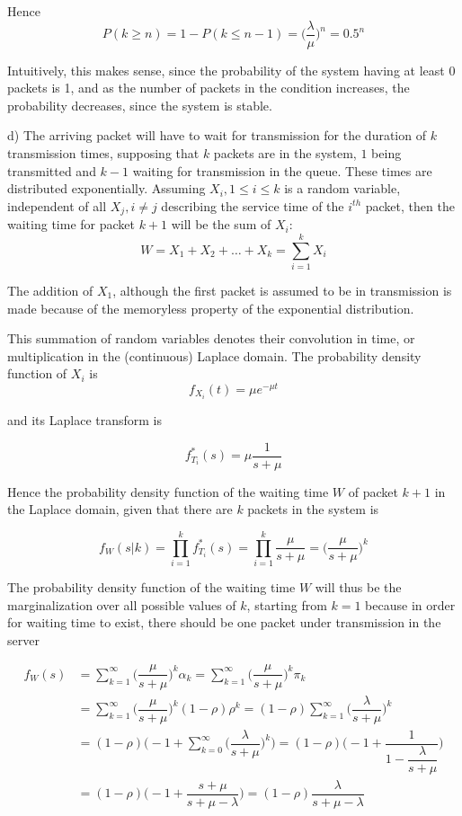 Hence
$$P(k \geq n) = 1 - P(k \leq n-1) = \Big(\dfrac{\lambda}{\mu}\Big)^n = 0.5^n$$

Intuitively, this makes sense, since the probability of the system having at
least 0 packets is 1, and as the number of packets in the condition increases,
the probability decreases, since the system is stable.

d)
The arriving packet will have to wait for transmission for the duration of $k$
transmission times, supposing that $k$ packets are in the system, $1$ being
transmitted and $k-1$ waiting for transmission in the queue. These times are
distributed exponentially. Assuming $X_i, 1 \leq i \leq k$ is a random variable,
independent of all $X_j, i \neq j$ describing the service time of the $i^{th}$
packet, then the waiting time for packet $k+1$ will be the sum of $X_i$:
$$W = X_1 + X_2 + \dots + X_k = \sum_{i=1}^{k}X_i$$

The addition of $X_1$, although the first packet is assumed to be in transmission
is made because of the memoryless property of the exponential distribution.

This summation of random variables denotes their convolution in time, or
multiplication in the (continuous) Laplace domain. The probability density
function of $X_i$ is
$$f_{X_i}(t) = \mu e^{-\mu t}$$

and its Laplace transform is

$$f^{*}_{T_i}(s) = \mu \dfrac{1}{s+\mu}$$

Hence the probability density function of the waiting time $W$ of packet $k+1$ in
the Laplace domain, given that there are $k$ packets in the system is

$$f_W(s | k) = \prod_{i=1}^k f^{*}_{T_i}(s) = \prod_{i=1}^k \dfrac{\mu}{s+\mu} = \Big(\dfrac{\mu}{s+\mu}\Big)^k$$

The probability density function of the waiting time $W$ will thus be the
marginalization over all possible values of $k$, starting from $k=1$ because
in order for waiting time to exist, there should be one packet under
transmission in the server

\begin{align*}
  f_W(s) &= \sum_{k=1}^{\infty} \Big(\dfrac{\mu}{s+\mu}\Big)^k \alpha_k = \sum_{k=1}^{\infty} \Big(\dfrac{\mu}{s+\mu}\Big)^k \pi_k \\
         &= \sum_{k=1}^{\infty} \Big(\dfrac{\mu}{s+\mu}\Big)^k (1-\rho) \rho^k = (1-\rho) \sum_{k=1}^{\infty} \Big(\dfrac{\lambda}{s+\mu}\Big)^k \\
         &= (1-\rho) \Big(-1 + \sum_{k=0}^{\infty} \Big(\dfrac{\lambda}{s+\mu}\Big)^k\Big) = (1-\rho) \Big(-1 + \dfrac{1}{1-\dfrac{\lambda}{s+\mu}}\Big) \\
         &= (1-\rho)\Big(-1 + \dfrac{s+\mu}{s+\mu-\lambda}\Big) = (1-\rho) \dfrac{\lambda}{s+\mu-\lambda}
\end{align*}


